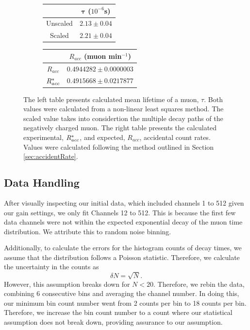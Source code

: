 \documentclass[
    aps, 
    twocolumn, 
    secnumarabic, 
    balancelastpage, 
    amsmath, 
    amssymb, 
    nofootinbib, 
    floatfix
]{revtex4-2}
\begin{document}
\begin{figure}[t]
	\centering
	\begin{subfigure}[t]{4cm}
         	\centering
		\begin{tabular}{c|c}
	    		 & $\bm{\tau}$ ($10^{-6}$s) \\
            		\hline
			Unscaled & $2.13 \pm 0.04$ \\ 
			Scaled & $2.21 \pm 0.04$ \\
		\end{tabular}
     	\end{subfigure}
	\hspace{1mm}
     	\begin{subfigure}[t]{4cm}
         	\centering
		\begin{tabular}{c|c}
			 & $R_{acc}$ (muon min$^{-1}$) \\
            		\hline
			$R_{acc}$ & $0.4944282\pm 0.0000003$ \\ 
			$R_{acc}^{\**}$ & $0.4915668 \pm 0.0217877$ \\
		\end{tabular}
     	\end{subfigure}
	\hspace{1mm}
     	\bigskip
	\caption{The left table presents calculated mean lifetime of a muon, $\tau$. Both values were calculated from a non-linear least squares method. The scaled value takes into considertion the multiple decay paths of the negatively charged muon. The right table presents the calculated experimental, $R_{acc}^{\**}$, and expected, $R_{acc}$, accidental count rates. Values were calculated following the method outlined in Section \ref{sec:accidentRate}.}
	\label{fig:outputs}
\end{figure}

\subsection{Data Handling}
\label{sec:dataHand}

After visually inspecting our initial data, which included channels 1 to 512 given our gain settings, we only fit Channels 12 to 512. This is because the first few data channels were not within the expected exponential decay of the muon time distribution. We attribute this to random noise binning. 

Additionally, to calculate the errors for the histogram counts of decay times, we assume that the distribution follows a Poisson statistic. Therefore, we calculate the uncertainty in the counts as 
\begin{equation}
	\delta N = \sqrt{N}. 
	\label{eq:nUncert}
\end{equation}
However, this assumption breaks down for $N < 20$. Therefore, we rebin the data, combining 6 consecutive bins and averaging the channel number. In doing this, our minimum bin count number went from 2 counts per bin to 18 counts per bin. Therefore, we increase the bin count number to a count where our statistical assumption does not break down, providing assurance to our assumption. 
\end{document}
